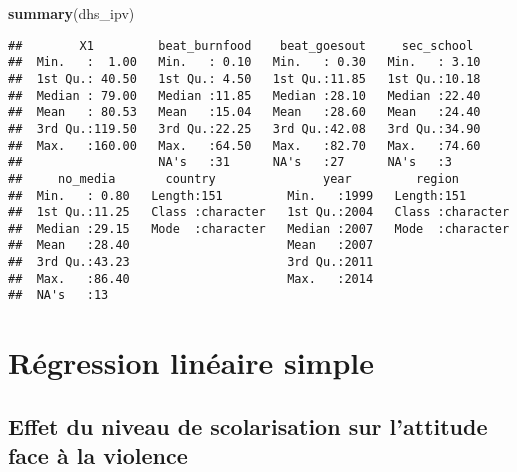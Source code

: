 \documentclass[
]{article}
\newenvironment{Shaded}{\begin{snugshade}}{\end{snugshade}}
\newcommand{\KeywordTok}[1]{\textcolor[rgb]{0.13,0.29,0.53}{\textbf{#1}}}
\newcommand{\NormalTok}[1]{#1}
\newcommand{\OperatorTok}[1]{\textcolor[rgb]{0.81,0.36,0.00}{\textbf{#1}}}
\begin{document}
\begin{Shaded}
\begin{Highlighting}[]
\KeywordTok{summary}\NormalTok{(dhs_ipv)}
\end{Highlighting}
\end{Shaded}

\begin{verbatim}
##        X1         beat_burnfood    beat_goesout     sec_school   
##  Min.   :  1.00   Min.   : 0.10   Min.   : 0.30   Min.   : 3.10  
##  1st Qu.: 40.50   1st Qu.: 4.50   1st Qu.:11.85   1st Qu.:10.18  
##  Median : 79.00   Median :11.85   Median :28.10   Median :22.40  
##  Mean   : 80.53   Mean   :15.04   Mean   :28.60   Mean   :24.40  
##  3rd Qu.:119.50   3rd Qu.:22.25   3rd Qu.:42.08   3rd Qu.:34.90  
##  Max.   :160.00   Max.   :64.50   Max.   :82.70   Max.   :74.60  
##                   NA's   :31      NA's   :27      NA's   :3      
##     no_media       country               year         region         
##  Min.   : 0.80   Length:151         Min.   :1999   Length:151        
##  1st Qu.:11.25   Class :character   1st Qu.:2004   Class :character  
##  Median :29.15   Mode  :character   Median :2007   Mode  :character  
##  Mean   :28.40                      Mean   :2007                     
##  3rd Qu.:43.23                      3rd Qu.:2011                     
##  Max.   :86.40                      Max.   :2014                     
##  NA's   :13
\end{verbatim}

\hypertarget{ruxe9gression-linuxe9aire-simple}{%
\section{Régression linéaire
simple}\label{ruxe9gression-linuxe9aire-simple}}

\hypertarget{effet-du-niveau-de-scolarisation-sur-lattitude-face-uxe0-la-violence}{%
\subsection{Effet du niveau de scolarisation sur l'attitude face à la
violence}\label{effet-du-niveau-de-scolarisation-sur-lattitude-face-uxe0-la-violence}}

\begin{Shaded}
\end{Shaded}
\end{document}
